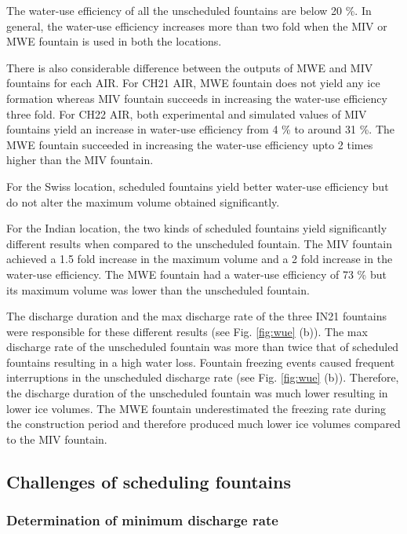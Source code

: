 \documentclass[tc, manuscript]{copernicus}
\begin{document}

The water-use efficiency of all the unscheduled fountains are below 20 \%. In general, the water-use efficiency
increases more than two fold when the MIV or MWE fountain is used in both the locations.  

There is also considerable difference between the outputs of MWE and MIV fountains for each AIR. For CH21 AIR,
MWE fountain does not yield any ice formation whereas MIV fountain succeeds in increasing the water-use
efficiency three fold. For CH22 AIR, both experimental and simulated values of MIV fountains yield an increase
in water-use efficiency from 4 \% to around 31 \%. The MWE fountain succeeded in increasing the water-use
efficiency upto 2 times higher than the MIV fountain.

For the Swiss location, scheduled fountains yield better water-use efficiency but do not alter the maximum
volume obtained significantly. 

For the Indian location, the two kinds of scheduled fountains yield significantly different results when
compared to the unscheduled fountain. The MIV fountain achieved a 1.5 fold increase in the maximum volume and a
2 fold increase in the water-use efficiency. The MWE fountain had a water-use efficiency of 73 \% but its
maximum volume was lower than the unscheduled fountain. 

The discharge duration and the max discharge rate of the three IN21 fountains were responsible for these
different results (see Fig. \ref{fig:wue} (b)). The max discharge rate of the unscheduled fountain was more than
twice that of scheduled fountains resulting in a high water loss.  Fountain freezing events caused frequent
interruptions in the unscheduled discharge rate (see Fig. \ref{fig:wue} (b)). Therefore, the discharge duration
of the unscheduled fountain was much lower resulting in lower ice volumes. The MWE fountain underestimated the
freezing rate during the construction period and therefore produced much lower ice volumes compared to the MIV
fountain.

\subsection{Challenges of scheduling fountains}

\subsubsection{Determination of minimum discharge rate}
\end{document}
